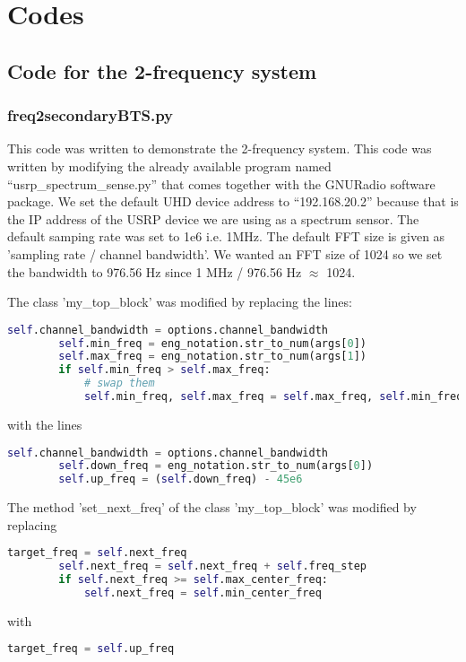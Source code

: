 \chapter{Codes}

\section{Code for the 2-frequency system}


\subsection{freq2secondaryBTS.py}

This code was written to demonstrate the 2-frequency system.
This code was written by modifying the already available program named 
``usrp\_spectrum\_sense.py'' that comes together with the GNURadio software
package. We set the 
default UHD device address to ``192.168.20.2'' because that is the IP address
of the USRP device we are using as a spectrum sensor. The default samping rate
was set to 1e6 i.e. 1MHz. The default FFT size is given as 'sampling rate /
channel bandwidth'. We wanted an FFT size of 1024 so we set the bandwidth to
976.56 Hz since 1 MHz / 976.56 Hz $\approx$ 1024.

The class 'my\_top\_block' was modified by replacing the lines:
\begin{lstlisting}[language=Python]
        self.channel_bandwidth = options.channel_bandwidth
        self.min_freq = eng_notation.str_to_num(args[0])
        self.max_freq = eng_notation.str_to_num(args[1])
        if self.min_freq > self.max_freq:
            # swap them
            self.min_freq, self.max_freq = self.max_freq, self.min_freq    
\end{lstlisting}
with the lines
\begin{lstlisting}[language=Python]
        self.channel_bandwidth = options.channel_bandwidth
        self.down_freq = eng_notation.str_to_num(args[0])
        self.up_freq = (self.down_freq) - 45e6    
\end{lstlisting}

The method 'set\_next\_freq' of the class 'my\_top\_block' was modified by
replacing
\begin{lstlisting}[language=Python]
        target_freq = self.next_freq
        self.next_freq = self.next_freq + self.freq_step
        if self.next_freq >= self.max_center_freq:
            self.next_freq = self.min_center_freq
\end{lstlisting}
with
\begin{lstlisting}[language=Python]
        target_freq = self.up_freq
\end{lstlisting}




